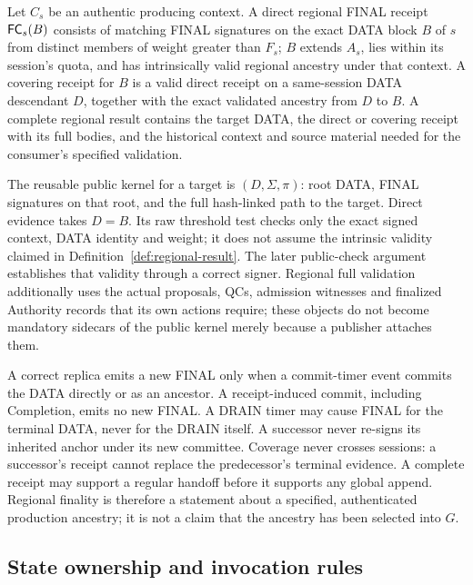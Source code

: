\begin{definition}
\label{def:regional-result}
Let $C_s$ be an authentic producing context. A direct regional FINAL
receipt $\mathsf{FC}_s(B)$ consists of matching FINAL signatures on the exact
DATA block $B$ of $s$ from distinct members of weight greater than $F_s$;
$B$ extends
$A_s$, lies within its session's quota, and has intrinsically valid
regional ancestry under that context. A covering receipt for $B$ is a
valid direct receipt on a same-session DATA descendant $D$, together
with the exact validated ancestry from $D$ to $B$.
A complete regional result contains the target DATA, the direct or
covering receipt with its full bodies, and the historical context and
source material needed for the consumer's specified validation.
\end{definition}
The reusable public kernel for a target is $(D,\Sigma,\pi)$: root DATA,
FINAL signatures on that root, and the full hash-linked path to the
target. Direct evidence takes $D=B$. Its raw threshold test checks only
the exact signed context, DATA identity and weight; it does not assume
the intrinsic validity claimed in Definition~\ref{def:regional-result}.
The later public-check argument establishes that validity through a
correct signer. Regional full validation additionally uses the actual
proposals, QCs, admission witnesses and finalized Authority records
that its own actions require; these objects do not become mandatory
sidecars of the public kernel merely because a publisher attaches them.

A correct replica emits a new FINAL only when a commit-timer event
commits the DATA directly or as an ancestor. A receipt-induced commit,
including Completion, emits no new FINAL. A DRAIN timer may cause FINAL
for the terminal DATA, never for the DRAIN itself. A successor never
re-signs its inherited anchor under its new committee. Coverage never
crosses sessions: a successor's receipt cannot replace the predecessor's
terminal evidence. A complete receipt may support a regular handoff
before it supports any global append. Regional finality is therefore a
statement about a specified, authenticated production ancestry; it is
not a claim that the ancestry has been selected into $G$.

\subsection{State ownership and invocation rules}
\label{sec:objects-state}

